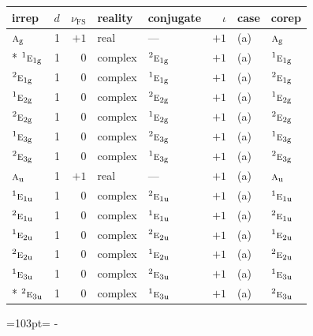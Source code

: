 \documentclass[10pt,a4paper]{article}
\newcommand{\needspace}[1]{\par\penalty-100\begingroup\dimen0=#1\relax\dimen2=\pagegoal
  \advance\dimen2-\pagetotal\ifdim\dimen0>\dimen2\relax\ifdim\dimen2>0pt\vfil\break\fi\fi
  \endgroup}
\numberwithin{equation}{section}
\newcommand{\irr}[1]{\text{\normalfont\scshape #1}}
\newcommand{\conjpair}[1]{{}^{#1}}
\newcommand{\ptag}[1]{\mathrm{#1}}
\newcommand{\fsind}{\nu_{\mathrm{FS}}}
\begin{document}
{\small\renewcommand{\arraystretch}{1.25}\setlength{\tabcolsep}{4pt}\begin{longtable}{@{}lrrllrll@{}}\toprule
irrep & $d$ & $\fsind$ & reality & conjugate & $\iota$ & case & corep\\\midrule\endhead
\bottomrule\endfoot\endlastfoot
$\irr{a}_{\ptag{g}}$ & 1 & $+1$ & real & --- & $+1$ & (a) & $\irr{a}_{\ptag{g}}$\\*
$\conjpair{1}\irr{e}_{1\ptag{g}}$ & 1 & $0$ & complex & $\conjpair{2}\irr{e}_{1\ptag{g}}$ & $+1$ & (a) & $\conjpair{1}\irr{e}_{1\ptag{g}}$\\
$\conjpair{2}\irr{e}_{1\ptag{g}}$ & 1 & $0$ & complex & $\conjpair{1}\irr{e}_{1\ptag{g}}$ & $+1$ & (a) & $\conjpair{2}\irr{e}_{1\ptag{g}}$\\
$\conjpair{1}\irr{e}_{2\ptag{g}}$ & 1 & $0$ & complex & $\conjpair{2}\irr{e}_{2\ptag{g}}$ & $+1$ & (a) & $\conjpair{1}\irr{e}_{2\ptag{g}}$\\
$\conjpair{2}\irr{e}_{2\ptag{g}}$ & 1 & $0$ & complex & $\conjpair{1}\irr{e}_{2\ptag{g}}$ & $+1$ & (a) & $\conjpair{2}\irr{e}_{2\ptag{g}}$\\
$\conjpair{1}\irr{e}_{3\ptag{g}}$ & 1 & $0$ & complex & $\conjpair{2}\irr{e}_{3\ptag{g}}$ & $+1$ & (a) & $\conjpair{1}\irr{e}_{3\ptag{g}}$\\
$\conjpair{2}\irr{e}_{3\ptag{g}}$ & 1 & $0$ & complex & $\conjpair{1}\irr{e}_{3\ptag{g}}$ & $+1$ & (a) & $\conjpair{2}\irr{e}_{3\ptag{g}}$\\
$\irr{a}_{\ptag{u}}$ & 1 & $+1$ & real & --- & $+1$ & (a) & $\irr{a}_{\ptag{u}}$\\
$\conjpair{1}\irr{e}_{1\ptag{u}}$ & 1 & $0$ & complex & $\conjpair{2}\irr{e}_{1\ptag{u}}$ & $+1$ & (a) & $\conjpair{1}\irr{e}_{1\ptag{u}}$\\
$\conjpair{2}\irr{e}_{1\ptag{u}}$ & 1 & $0$ & complex & $\conjpair{1}\irr{e}_{1\ptag{u}}$ & $+1$ & (a) & $\conjpair{2}\irr{e}_{1\ptag{u}}$\\
$\conjpair{1}\irr{e}_{2\ptag{u}}$ & 1 & $0$ & complex & $\conjpair{2}\irr{e}_{2\ptag{u}}$ & $+1$ & (a) & $\conjpair{1}\irr{e}_{2\ptag{u}}$\\
$\conjpair{2}\irr{e}_{2\ptag{u}}$ & 1 & $0$ & complex & $\conjpair{1}\irr{e}_{2\ptag{u}}$ & $+1$ & (a) & $\conjpair{2}\irr{e}_{2\ptag{u}}$\\
$\conjpair{1}\irr{e}_{3\ptag{u}}$ & 1 & $0$ & complex & $\conjpair{2}\irr{e}_{3\ptag{u}}$ & $+1$ & (a) & $\conjpair{1}\irr{e}_{3\ptag{u}}$\\*
$\conjpair{2}\irr{e}_{3\ptag{u}}$ & 1 & $0$ & complex & $\conjpair{1}\irr{e}_{3\ptag{u}}$ & $+1$ & (a) & $\conjpair{2}\irr{e}_{3\ptag{u}}$\\
\bottomrule\end{longtable}}
\needspace{103pt}
\end{document}
